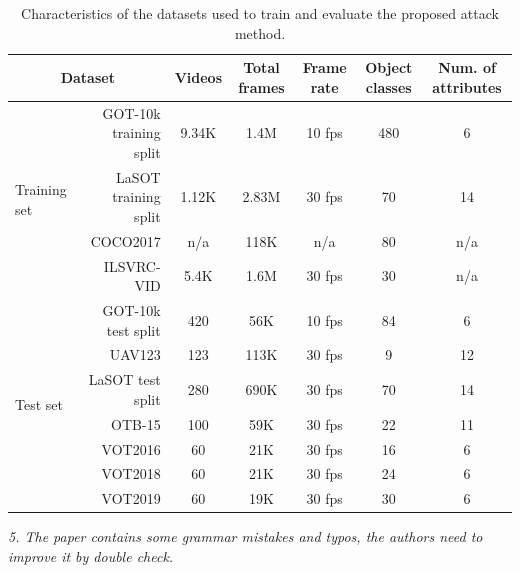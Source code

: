 \documentclass[12pt]{article}
\begin{document}
\begin{table}[h]
    \caption{Characteristics of the datasets used to train and evaluate the proposed attack method.}
    \begin{tabular}{lrccccc} \toprule
    \multicolumn{2}{c}{Dataset}                            & Videos & Total frames & Frame rate & Object classes & Num. of attributes \\ \midrule
    \multirow{4}{*}{Training set} & GOT-10k training split & 9.34K & 1.4M        & 10 fps     & 480            & 6                  \\
                                  & LaSOT training split   & 1.12K & 2.83M        & 30 fps     & 70             & 14                 \\
                                  & COCO2017               & n/a    & 118K         & n/a        & 80             & n/a                \\
                                  & ILSVRC-VID             & 5.4K  & 1.6M         & 30 fps     & 30             & n/a                \\ \midrule
    \multirow{7}{*}{Test set}     & GOT-10k test split     & 420    & 56K          & 10 fps     & 84             & 6                  \\
                                  & UAV123                 & 123    & 113K         & 30 fps     & 9              & 12                 \\
                                  & LaSOT test split       & 280    & 690K         & 30 fps     & 70             & 14                 \\
                                  & OTB-15                 & 100    & 59K          & 30 fps     & 22             & 11                 \\
                                  & VOT2016                & 60     & 21K          & 30 fps     & 16             & 6                  \\
                                  & VOT2018                & 60     & 21K          & 30 fps     & 24             & 6                  \\ 
                                  & VOT2019                & 60     & 19K          & 30 fps     & 30             & 6                  \\ \bottomrule
    \end{tabular}
    \label{tab:dataset}
\end{table}

\textit{5. The paper contains some grammar mistakes and typos, the authors need to improve it by double check.}
\end{document}
